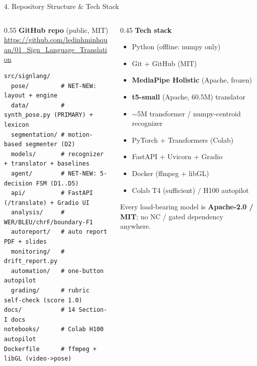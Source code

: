 \documentclass[10pt,aspectratio=169]{beamer}
\begin{document}
\begin{frame}[fragile]{4. Repository Structure \& Tech Stack}
\begin{columns}[T]
\begin{column}{0.55\textwidth}
\textbf{GitHub repo} (public, MIT) \\
\scriptsize \url{https://github.com/ledinhminhquan/01_Sign_Language_Translation}

\vspace{0.1cm}
\begin{lstlisting}[basicstyle=\ttfamily\tiny]
src/signlang/
  pose/         # NET-NEW: layout + engine
  data/         # synth_pose.py (PRIMARY) + lexicon
  segmentation/ # motion-based segmenter (D2)
  models/       # recognizer + translator + baselines
  agent/        # NET-NEW: 5-decision FSM (D1..D5)
  api/          # FastAPI (/translate) + Gradio UI
  analysis/     # WER/BLEU/chrF/boundary-F1
  autoreport/   # auto report PDF + slides
  monitoring/   # drift_report.py
  automation/   # one-button autopilot
  grading/      # rubric self-check (score 1.0)
docs/           # 14 Section-I docs
notebooks/      # Colab H100 autopilot
Dockerfile      # ffmpeg + libGL (video->pose)
\end{lstlisting}
\end{column}
\begin{column}{0.45\textwidth}
\textbf{Tech stack}
\begin{itemize}\small
  \item Python (offline: numpy only)
  \item Git + GitHub (MIT)
  \item \textbf{MediaPipe Holistic} (Apache, frozen)
  \item \textbf{t5-small} (Apache, 60.5M) translator
  \item $\sim$5M transformer / numpy-centroid recognizer
  \item PyTorch + Transformers (Colab)
  \item FastAPI + Uvicorn + Gradio
  \item Docker (ffmpeg + libGL)
  \item Colab T4 (sufficient) / H100 autopilot
\end{itemize}
\scriptsize Every load-bearing model is \textbf{Apache-2.0 / MIT}; no NC / gated dependency anywhere.
\end{column}
\end{columns}
\end{frame}
\end{document}

